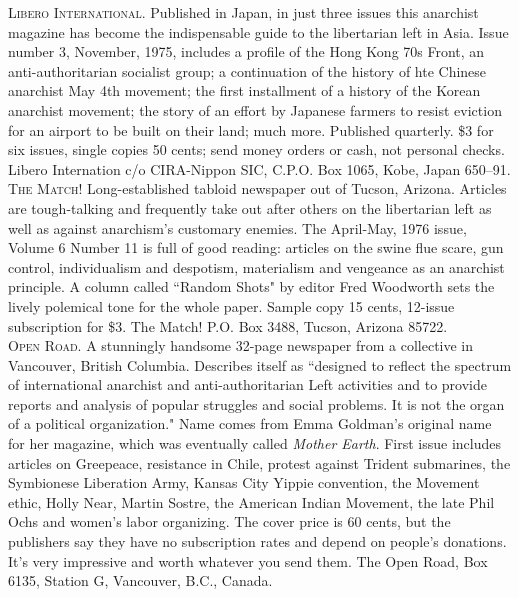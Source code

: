 \documentclass[12pt, onecolumn, letterpaper, oneside]{book}
\begin{document}
\noindent\textsc{Libero International.} Published in Japan, in just three issues this anarchist magazine has become the indispensable guide to the libertarian left in Asia. Issue number 3, November, 1975, includes a profile of the Hong Kong 70s Front, an anti-authoritarian socialist group; a continuation of the history of hte Chinese anarchist May 4th movement; the first installment of a history of the Korean anarchist movement; the story of an effort by Japanese farmers to resist eviction for an airport to be built on their land; much more. Published quarterly. \$3 for six issues, single copies 50 cents; send money orders or cash, not personal checks. Libero Internation c/o CIRA-Nippon SIC, C.P.O. Box 1065, Kobe, Japan 650--91.\\

\noindent\textsc{The Match!} Long-established tabloid newspaper out of Tucson, Arizona. Articles are tough-talking and frequently take out after others on the libertarian left as well as against anarchism's customary enemies. The April-May, 1976 issue, Volume 6 Number 11 is full of good reading: articles on the swine flue scare, gun control, individualism and despotism, materialism and vengeance as an anarchist principle. A column called ``Random Shots" by editor Fred Woodworth sets the lively polemical tone for the whole paper. Sample copy 15 cents, 12-issue subscription for \$3. The Match! P.O. Box 3488, Tucson, Arizona 85722.\\

\noindent\textsc{Open Road.} A stunningly handsome 32-page newspaper from a collective in Vancouver, British Columbia. Describes itself as ``designed to reflect the spectrum of international anarchist and anti-authoritarian Left activities and to provide reports and analysis of popular struggles and social problems. It is not the organ of a political organization." Name comes from Emma Goldman's original name for her magazine, which was eventually called \emph{Mother Earth}. First issue includes articles on Greepeace, resistance in Chile, protest against Trident submarines, the Symbionese Liberation Army, Kansas City Yippie convention, the Movement ethic, Holly Near, Martin Sostre, the American Indian Movement, the late Phil Ochs and women's labor organizing. The cover price is 60 cents, but the publishers say they have no subscription rates and depend on people's donations. It's very impressive and worth whatever you send them. The Open Road, Box 6135, Station G, Vancouver, B.C., Canada.\\
\end{document}
